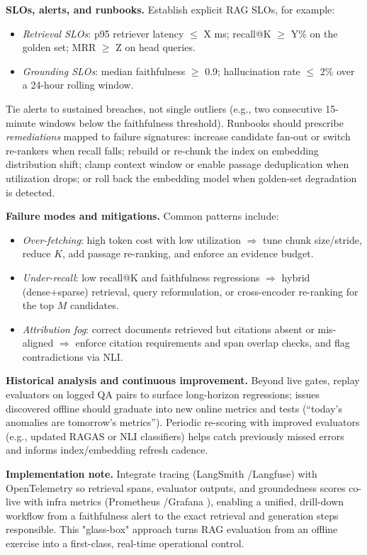 \medskip
\noindent\textbf{SLOs, alerts, and runbooks.}
Establish explicit RAG SLOs, for example:
\begin{itemize}
    \item \emph{Retrieval SLOs}: p95 retriever latency $\leq$ X ms; recall@K $\geq$ Y\% on the golden set; MRR $\geq$ Z on head queries.
    \item \emph{Grounding SLOs}: median faithfulness $\geq$ 0.9; hallucination rate $\leq$ 2\% over a 24-hour rolling window.
\end{itemize}
Tie alerts to sustained breaches, not single outliers (e.g., two consecutive 15-minute windows below the faithfulness threshold). Runbooks should prescribe \emph{remediations} mapped to failure signatures: increase candidate fan-out or switch re-rankers when recall falls; rebuild or re-chunk the index on embedding distribution shift; clamp context window or enable passage deduplication when utilization drops; or roll back the embedding model when golden-set degradation is detected.

\medskip
\noindent\textbf{Failure modes and mitigations.}
Common patterns include:
\begin{itemize}
    \item \emph{Over-fetching}: high token cost with low utilization $\Rightarrow$ tune chunk size/stride, reduce $K$, add passage re-ranking, and enforce an evidence budget.
    \item \emph{Under-recall}: low recall@K and faithfulness regressions $\Rightarrow$ hybrid (dense+sparse) retrieval, query reformulation, or cross-encoder re-ranking for the top $M$ candidates.
    \item \emph{Attribution fog}: correct documents retrieved but citations absent or mis-aligned $\Rightarrow$ enforce citation requirements and span overlap checks, and flag contradictions via NLI.
\end{itemize}

\medskip
\noindent\textbf{Historical analysis and continuous improvement.}
Beyond live gates, replay evaluators on logged QA pairs to surface long-horizon regressions; issues discovered offline should graduate into new online metrics and tests (``today’s anomalies are tomorrow’s metrics''). Periodic re-scoring with improved evaluators (e.g., updated RAGAS or NLI classifiers) helps catch previously missed errors and informs index/embedding refresh cadence.

\medskip
\noindent\textbf{Implementation note.}
Integrate tracing (LangSmith \cite{langsmith_home}/Langfuse) with OpenTelemetry \cite{otel_spec} so retrieval spans, evaluator outputs, and groundedness scores co-live with infra metrics (Prometheus \cite{prometheus_instrumentation}/Grafana \cite{grafana_dashboards}), enabling a unified, drill-down workflow from a faithfulness alert to the exact retrieval and generation steps responsible. This "glass-box" approach turns RAG evaluation from an offline exercise into a first-class, real-time operational control.

